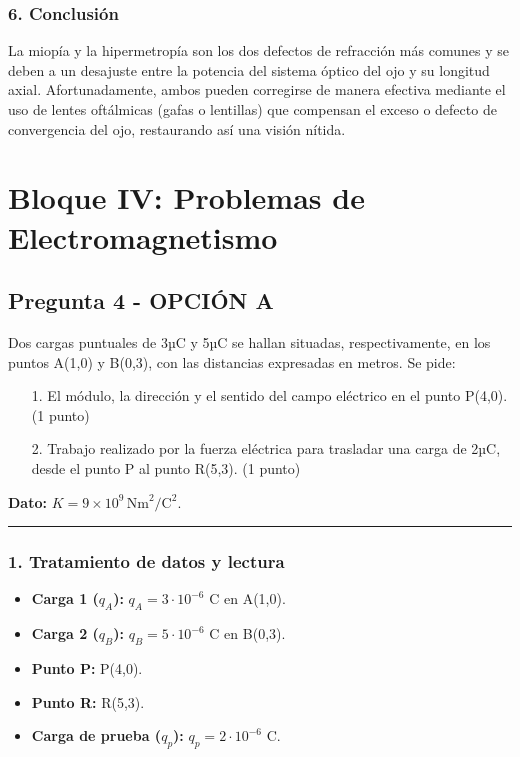 \subsubsection*{6. Conclusión}
\begin{cajaconclusion}
La miopía y la hipermetropía son los dos defectos de refracción más comunes y se deben a un desajuste entre la potencia del sistema óptico del ojo y su longitud axial. Afortunadamente, ambos pueden corregirse de manera efectiva mediante el uso de lentes oftálmicas (gafas o lentillas) que compensan el exceso o defecto de convergencia del ojo, restaurando así una visión nítida.
\end{cajaconclusion}

\newpage

\section{Bloque IV: Problemas de Electromagnetismo}
\label{sec:em_2003_sep_ext}

\subsection{Pregunta 4 - OPCIÓN A}
\label{subsec:4A_2003_sep_ext}

\begin{cajaenunciado}
Dos cargas puntuales de 3µC y 5µC se hallan situadas, respectivamente, en los puntos A(1,0) y B(0,3), con las distancias expresadas en metros. Se pide:
\begin{enumerate}
    \item[1.] El módulo, la dirección y el sentido del campo eléctrico en el punto P(4,0). (1 punto)
    \item[2.] Trabajo realizado por la fuerza eléctrica para trasladar una carga de 2µC, desde el punto P al punto R(5,3). (1 punto)
\end{enumerate}
\textbf{Dato:} $K=9\times10^9\,\text{Nm}^2/\text{C}^2$.
\end{cajaenunciado}
\hrule

\subsubsection*{1. Tratamiento de datos y lectura}
\begin{itemize}
    \item \textbf{Carga 1 ($q_A$):} $q_A = 3 \cdot 10^{-6}$ C en A(1,0).
    \item \textbf{Carga 2 ($q_B$):} $q_B = 5 \cdot 10^{-6}$ C en B(0,3).
    \item \textbf{Punto P:} P(4,0).
    \item \textbf{Punto R:} R(5,3).
    \item \textbf{Carga de prueba ($q_p$):} $q_p = 2 \cdot 10^{-6}$ C.
\end{itemize}

